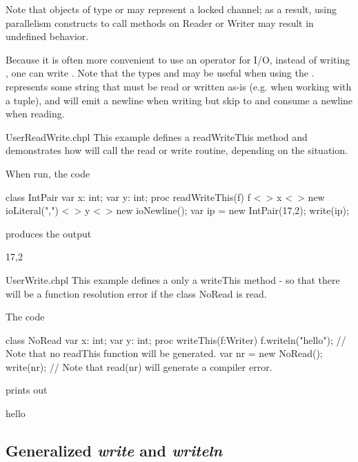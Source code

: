 Note that objects of type  or  may represent a locked channel; as a result, using parallelism constructs to call methods on Reader or Writer may result in undefined behavior.

Because it is often more convenient to use an operator for I/O, instead of writing , one can write . Note that the types  and  may be useful when using the \chpl{<~>}.  represents some string that must be read or written as-is (e.g.  when working with a tuple), and  will emit a newline when writing but skip to and consume a newline when reading.

\begin{chapelexample}{UserReadWrite.chpl}
This example defines a readWriteThis method and demonstrates how \chpl{<~>} will
call the read or write routine, depending on the situation.

When run, the code
\begin{chapel}
class IntPair {
  var x: int;
  var y: int;
  proc readWriteThis(f) {
    f <~> x <~> new ioLiteral(",") <~> y <~> new ioNewline();
  }
}
var ip = new IntPair(17,2);
write(ip);
\end{chapel}
produces the output
\begin{chapelprintoutput}{}
17,2
\end{chapelprintoutput}
\end{chapelexample}

\begin{chapelexample}{UserWrite.chpl}
This example defines a only a writeThis method - so that there will be a function resolution error if the class NoRead is read.

The code
\begin{chapel}
class NoRead {
  var x: int;
  var y: int;
  proc writeThis(f:Writer) {
    f.writeln("hello");
  }
  // Note that no readThis function will be generated.
}
var nr = new NoRead();
write(nr);
// Note that read(nr) will generate a compiler error.
\end{chapel}
prints out
\begin{chapelprintoutput}{}
hello
\end{chapelprintoutput}
\end{chapelexample}


\subsection{Generalized {\em write} and {\em writeln}}
\label{writer}

